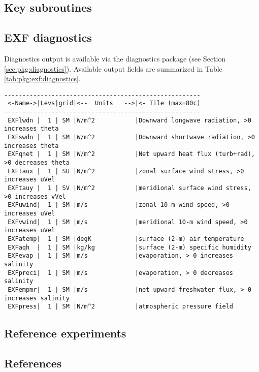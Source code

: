 
\subsection{Key subroutines
\label{sec:pkg:exf:subroutines}}


\subsection{EXF diagnostics
\label{sec:pkg:exf:diagnostics}}

Diagnostics output is available via the diagnostics package
(see Section \ref{sec:pkg:diagnostics}).
Available output fields are summarized in 
Table \ref{tab:pkg:exf:diagnostics}.

\begin{table}
\label{tab:pkg:exf:diagnostics}
\caption{~}
{\footnotesize
\begin{verbatim}
------------------------------------------------------
 <-Name->|Levs|grid|<--  Units   -->|<- Tile (max=80c)
------------------------------------------------------
 EXFlwdn |  1 | SM |W/m^2           |Downward longwave radiation, >0 increases theta
 EXFswdn |  1 | SM |W/m^2           |Downward shortwave radiation, >0 increases theta
 EXFqnet |  1 | SM |W/m^2           |Net upward heat flux (turb+rad), >0 decreases theta
 EXFtaux |  1 | SU |N/m^2           |zonal surface wind stress, >0 increases uVel
 EXFtauy |  1 | SV |N/m^2           |meridional surface wind stress, >0 increases vVel
 EXFuwind|  1 | SM |m/s             |zonal 10-m wind speed, >0 increases uVel
 EXFvwind|  1 | SM |m/s             |meridional 10-m wind speed, >0 increases uVel
 EXFatemp|  1 | SM |degK            |surface (2-m) air temperature
 EXFaqh  |  1 | SM |kg/kg           |surface (2-m) specific humidity
 EXFevap |  1 | SM |m/s             |evaporation, > 0 increases salinity
 EXFpreci|  1 | SM |m/s             |evaporation, > 0 decreases salinity
 EXFempmr|  1 | SM |m/s             |net upward freshwater flux, > 0 increases salinity
 EXFpress|  1 | SM |N/m^2           |atmospheric pressure field
\end{verbatim}
}
\end{table}


\subsection{Reference experiments}


\subsection{References}
